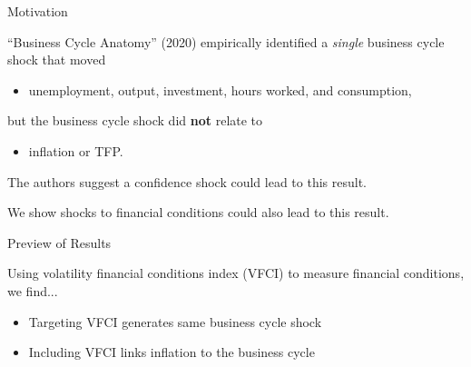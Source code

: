 \begin{frame}{Motivation}
  \vspace{0.25cm}

  ``Business Cycle Anatomy'' (2020) empirically identified a \textit{single} business cycle shock that moved
  \begin{itemize}
    \item unemployment, output, investment, hours worked, and consumption,
  \end{itemize}
  but the business cycle shock did \textbf{not} relate to
  \begin{itemize}
    \item inflation or TFP.
  \end{itemize}

  The authors suggest a confidence shock could lead to this result.

  \vspace{0.5cm}

  We show shocks to financial conditions could also lead to this result.

\end{frame}


\begin{frame}{Preview of Results}

  Using volatility financial conditions index (VFCI) to measure financial conditions, we find...

  \begin{itemize}
    \item Targeting VFCI generates same business cycle shock
    \item Including VFCI links inflation to the business cycle
  \end{itemize}

\end{frame}